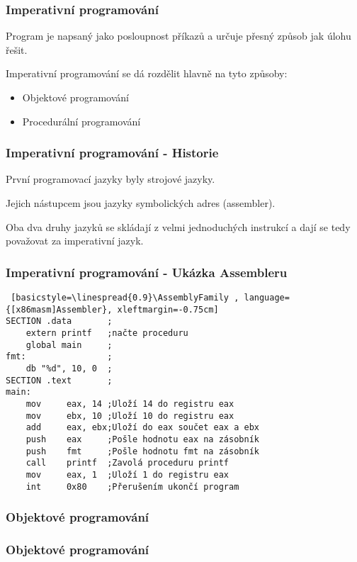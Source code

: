 \begin{frame}
    \frametitle{Imperativní programování}
    Program je napsaný jako posloupnost příkazů a určuje přesný způsob jak úlohu řešit. %

    Imperativní programování se dá rozdělit hlavně na tyto způsoby: 
    \begin{itemize}
        \item Objektové programování
        \item Procedurální programování
    \end{itemize}

    
\end{frame}

\begin{frame}[fragile]
    \frametitle{Imperativní programování - Historie}
    První programovací jazyky byly strojové jazyky. 

    Jejich nástupcem jsou jazyky symbolických adres (assembler). %
    
    Oba dva druhy jazyků se skládají z velmi jednoduchých instrukcí a dají se tedy považovat za imperativní jazyk.
\end{frame}

\begin{frame}[fragile]
    \frametitle{Imperativní programování - Ukázka Assembleru}

    \newfontfamily{}
    \begin{lstlisting} [basicstyle=\linespread{0.9}\AssemblyFamily , language={[x86masm]Assembler}, xleftmargin=-0.75cm]
SECTION .data       ;
    extern printf   ;načte proceduru
    global main     ;
fmt:                ;
    db "%d", 10, 0  ;
SECTION .text       ;
main:
    mov     eax, 14 ;Uloží 14 do registru eax
    mov     ebx, 10 ;Uloží 10 do registru eax
    add     eax, ebx;Uloží do eax součet eax a ebx 
    push    eax     ;Pošle hodnotu eax na zásobník
    push    fmt     ;Pošle hodnotu fmt na zásobník
    call    printf  ;Zavolá proceduru printf
    mov     eax, 1  ;Uloží 1 do registru eax
    int     0x80    ;Přerušením ukončí program
    \end{lstlisting}
\end{frame}


\begin{frame}
    \frametitle{Objektové programování}
    

\end{frame}

\begin{frame}
    \frametitle{Objektové programování}
    
\end{frame}